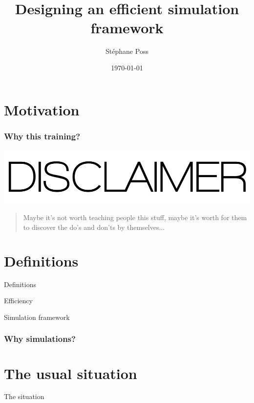 \documentclass[14pt]{beamer}
\title{Designing an efficient simulation framework}
\author{St\'ephane Poss}
\date{\today}
\begin{document}
\begin{frame}[plain]
\titlepage
\end{frame}

\begin{frame}
\tableofcontents
\end{frame}

\section{Motivation}
\begin{frame}
\frametitle{Why this training?}

\end{frame}

\begin{frame}
\includegraphics[width=\textwidth]{disclaimer}
\end{frame}

\begin{frame}
\begin{quote}
Maybe it's not worth teaching people this stuff, maybe it's worth for them to discover the do's and don'ts by themselves...
\end{quote}
\end{frame}

\section{Definitions}
\begin{frame}
Definitions
\end{frame}

\begin{frame}
Efficiency
\end{frame}

\begin{frame}
Simulation framework
\end{frame}

\begin{frame}
\frametitle{Why simulations?}
\end{frame}

\section{The usual situation}
\begin{frame}
The situation
\end{frame}
\end{document}
